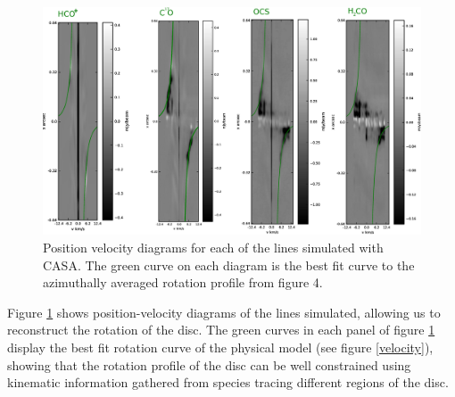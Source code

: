 \documentclass[useAMS,usenatbib]{mn2e}
\begin{document}
  


\begin{figure}
 \includegraphics[width=180mm]{Figures/sim/casa_all_30deg_PV_rotCurve_small.eps}
 \caption{Position velocity diagrams for each of the lines simulated with CASA. The green curve on each diagram is the best fit curve to the azimuthally averaged rotation profile from figure 4.}
 \label{pvs}
\end{figure}

Figure \ref{pvs} shows position-velocity diagrams of the lines simulated, allowing us to reconstruct the rotation of the disc. The green curves in each panel of figure \ref{pvs} display the best fit rotation curve of the physical model (see figure \ref{velocity}), showing that the rotation profile of the disc can be well constrained using kinematic information gathered from species tracing different regions of the disc.\smallskip
\end{document}
